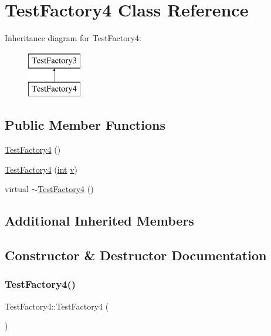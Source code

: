\hypertarget{class_test_factory4}{}\section{Test\+Factory4 Class Reference}
\label{class_test_factory4}
Inheritance diagram for Test\+Factory4\+:\begin{figure}[H]
\begin{center}
\leavevmode
\includegraphics[height=2.000000cm]{class_test_factory4}
\end{center}
\end{figure}
\subsection*{Public Member Functions}
\begin{DoxyCompactItemize}
\item 
\mbox{\hyperlink{class_test_factory4_acf2c49f646dc8d428f12a3fda61c4bf0}{Test\+Factory4}} ()
\item 
\mbox{\hyperlink{class_test_factory4_a5e0efb19a84e3fe959733f5719af02ca}{Test\+Factory4}} (\mbox{\hyperlink{warnings_8h_a74f207b5aa4ba51c3a2ad59b219a423b}{int}} \mbox{\hyperlink{_s_d_l__opengl_8h_a10a82eabcb59d2fcd74acee063775f90}{v}})
\item 
virtual \mbox{\hyperlink{class_test_factory4_a76462e5b4224fa898deb6a74976fe6c6}{$\sim$\+Test\+Factory4}} ()
\end{DoxyCompactItemize}
\subsection*{Additional Inherited Members}


\subsection{Constructor \& Destructor Documentation}
\mbox{\label{class_test_factory4_acf2c49f646dc8d428f12a3fda61c4bf0}} 
\subsubsection{\texorpdfstring{TestFactory4()}{TestFactory4()}\hspace{0.1cm}{\footnotesize\ttfamily [1/2]}}
{\footnotesize\ttfamily Test\+Factory4\+::\+Test\+Factory4 (\begin{DoxyParamCaption}{ }\end{DoxyParamCaption})\hspace{0.3cm}{\ttfamily [inline]}}

